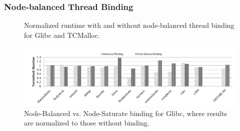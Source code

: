 \subsubsection{Node-balanced Thread Binding}
\label{sec: threadbinding}


\begin{figure}[!h]
\centering
{}

\caption{Normalized runtime with and without node-balanced thread binding for Glibc and TCMalloc.}
\label{binding-pthread-scalibity}
\end{figure}

\begin{figure}[!ht]
    \centering
    \includegraphics[width=5.5in]{figure/binding-policy.pdf}
    \caption{ Node-Balanced vs. Node-Saturate binding for Glibc, where results are normalized to those without binding.}
    \label{fig:binding-policy}  
\end{figure}

